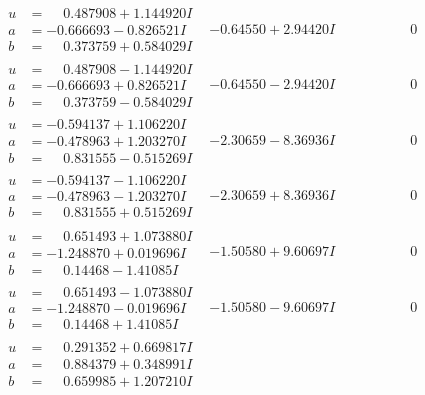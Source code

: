 \documentclass[1p]{elsarticle_modified}
\theoremstyle{definition}
\begin{document}
$$\begin{array}{c|c|c}
\begin{aligned}
u &= \phantom{-}0.487908 + 1.144920 I \\
a &= -0.666693 - 0.826521 I \\
b &= \phantom{-}0.373759 + 0.584029 I\end{aligned}
 & -0.64550 + 2.94420 I & \phantom{-0.000000 } 0 \\ \hline\begin{aligned}
u &= \phantom{-}0.487908 - 1.144920 I \\
a &= -0.666693 + 0.826521 I \\
b &= \phantom{-}0.373759 - 0.584029 I\end{aligned}
 & -0.64550 - 2.94420 I & \phantom{-0.000000 } 0 \\ \hline\begin{aligned}
u &= -0.594137 + 1.106220 I \\
a &= -0.478963 + 1.203270 I \\
b &= \phantom{-}0.831555 - 0.515269 I\end{aligned}
 & -2.30659 - 8.36936 I & \phantom{-0.000000 } 0 \\ \hline\begin{aligned}
u &= -0.594137 - 1.106220 I \\
a &= -0.478963 - 1.203270 I \\
b &= \phantom{-}0.831555 + 0.515269 I\end{aligned}
 & -2.30659 + 8.36936 I & \phantom{-0.000000 } 0 \\ \hline\begin{aligned}
u &= \phantom{-}0.651493 + 1.073880 I \\
a &= -1.248870 + 0.019696 I \\
b &= \phantom{-}0.14468 - 1.41085 I\end{aligned}
 & -1.50580 + 9.60697 I & \phantom{-0.000000 } 0 \\ \hline\begin{aligned}
u &= \phantom{-}0.651493 - 1.073880 I \\
a &= -1.248870 - 0.019696 I \\
b &= \phantom{-}0.14468 + 1.41085 I\end{aligned}
 & -1.50580 - 9.60697 I & \phantom{-0.000000 } 0 \\ \hline\begin{aligned}
u &= \phantom{-}0.291352 + 0.669817 I \\
a &= \phantom{-}0.884379 + 0.348991 I \\
b &= \phantom{-}0.659985 + 1.207210 I\end{aligned}

\end{array}$$
\end{document}
